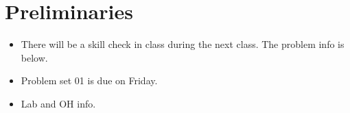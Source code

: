 \documentclass[12pt,letterpaper,noanswers]{exam}
\newcommand{\note}[1]{\textcolor{red}{#1}} %
\renewcommand{\note}[1]{} %
\begin{document}
 \pdfpageheight 11in 
  \pdfpagewidth 8.5in

\noindent 

\note{calendar:
\begin{enumerate}
    \item Tu binary subtraction, least sq intro PS01/2
    \item Th least sq PS02
    \item Tu lin alg PS02/3
    \item Th lin alg PS03
    \item Tu least sq PS03/4
    \item Th ?? PS04
    \item Tu root finding PS04/5
    \item Th root finding PS05 (early)
    \item Tu integration PS06
    \item Th quiz
    \item Tu interpolation PS06
    \item Th interpolation PS06
    \item Tu integration PS07
    \item Th Monte Carlo PS07
    \item Tu differentiation PS08
    \item Th differentiation PS08
    \item Tu diff eq
    \item Th application of diff eq
    \item Tu ODEs
    \item Th ODEs
    \item Tu neural nets
    \item Tu neural nets
    \item Th quiz
    \item Tu presentations
\end{enumerate}}

\note{
\begin{itemize}
    \item what is a floating point system
    \item example
    \item IDing info about a floating point system
    \item 
\end{itemize}
}
\setcounter{section}{-1}
\section{Preliminaries}
\begin{itemize}
\itemsep0pt
\item There will be a skill check in class during the next class.  The problem info is below.
\item Problem set 01 is due on Friday.
\item Lab and OH info.
\end{itemize}
\end{document}
